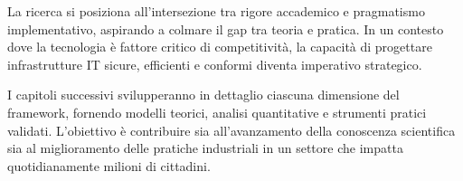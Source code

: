 La ricerca si posiziona all'intersezione tra rigore accademico e pragmatismo implementativo, aspirando a colmare il gap tra teoria e pratica. In un contesto dove la tecnologia è fattore critico di competitività, la capacità di progettare infrastrutture IT sicure, efficienti e conformi diventa imperativo strategico.

I capitoli successivi svilupperanno in dettaglio ciascuna dimensione del framework, fornendo modelli teorici, analisi quantitative e strumenti pratici validati. L'obiettivo è contribuire sia all'avanzamento della conoscenza scientifica sia al miglioramento delle pratiche industriali in un settore che impatta quotidianamente milioni di cittadini.

\clearpage
\printbibliography[
    heading=subbibliography,
    title={Riferimenti Bibliografici del Capitolo 1},
]

\endrefsection